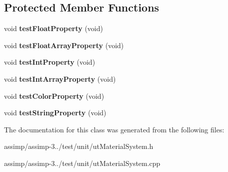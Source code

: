 \subsection*{Protected Member Functions}
\begin{DoxyCompactItemize}
\item 
\hypertarget{class_material_system_test_a23bad847da097d3183bb1cc527abebcd}{void {\bfseries test\+Float\+Property} (void)}\label{class_material_system_test_a23bad847da097d3183bb1cc527abebcd}

\item 
\hypertarget{class_material_system_test_ab3dacd250cf2c4a4f47270a090aed980}{void {\bfseries test\+Float\+Array\+Property} (void)}\label{class_material_system_test_ab3dacd250cf2c4a4f47270a090aed980}

\item 
\hypertarget{class_material_system_test_acff4a5151ccde2f4d65f5eeed2d275e1}{void {\bfseries test\+Int\+Property} (void)}\label{class_material_system_test_acff4a5151ccde2f4d65f5eeed2d275e1}

\item 
\hypertarget{class_material_system_test_a0230d972b25f9e0ede9b7c47d3d5bf53}{void {\bfseries test\+Int\+Array\+Property} (void)}\label{class_material_system_test_a0230d972b25f9e0ede9b7c47d3d5bf53}

\item 
\hypertarget{class_material_system_test_a16501405468c57a6db467b23b4521171}{void {\bfseries test\+Color\+Property} (void)}\label{class_material_system_test_a16501405468c57a6db467b23b4521171}

\item 
\hypertarget{class_material_system_test_a253058e348ee45ec38638862a6c7c7c4}{void {\bfseries test\+String\+Property} (void)}\label{class_material_system_test_a253058e348ee45ec38638862a6c7c7c4}

\end{DoxyCompactItemize}


The documentation for this class was generated from the following files\+:\begin{DoxyCompactItemize}
\item 
assimp/assimp-\/3../test/unit/ut\+Material\+System.\+h\item 
assimp/assimp-\/3../test/unit/ut\+Material\+System.\+cpp\end{DoxyCompactItemize}
